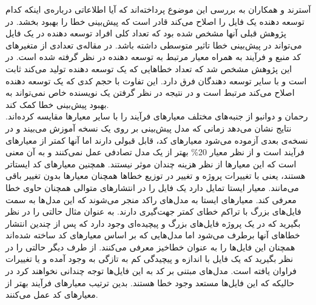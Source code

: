 آسترند و همکاران به بررسی این موضوع پرداخته‌اند که آیا اطلاعاتی درباره‌ی اینکه کدام توسعه دهنده یک فایل را اصلاح می‌کند قادر است که پیش‌بینی خطا را بهبود بخشد. در پژوهش قبلی آنها\cite{weyuker2008too} مشخص شده بود که تعداد کلی   افراد توسعه دهنده در یک فایل می‌تواند در پیش‌بینی خطا تاثیر متوسطی داشته باشد. در  مقاله‌ی \cite{ostrand2010programmer}  تعدادی از متغیرهای کد منبع و فرآیند به همراه معیار مرتبط به توسعه دهنده در نظر گرفته شده است.  در این پژوهش مشخص شد  که تعداد خطاهایی که یک توسعه دهنده تولید می‌کند ثابت است و با سایر توسعه دهندگان فرق دارد. این تفاوت با  حجم کدی که یک توسعه دهنده اصلاح می‌کند مرتبط است و در نتیجه در نظر گرفتن یک نویسنده خاص نمی‌تواند به بهبود پیش‌بینی خطا کمک کند\cite{ostrand2010programmer}. \\

رحمان و دوانبو از جنبه‌های مختلف معیارهای فرآیند  را با سایر معیارها مقایسه کرده‌اند\cite{rahman2013and}. نتایج نشان می‌دهد  زمانی که مدل پیش‌بینی بر روی یک نسخه آموزش می‌بیند و در نسخه‌ی بعدی آزموده می‌شود معیارهای کد،  قابل قبولی دارند اما    آنها کمتر از معیارهای فرآیند است  و از نظر معیار 20\% 
بهتر از یک مدل تصادفی عمل نمی‌کنند و  به آن معنی است که این معیارها از نظر هزینه چندان  موثر نیستند. همچنین معیارهای کد ایستاتر هستند، ‌یعنی با تغییرات پروژه و تغییر در توزیع خطاها همچنان معیارها بدون تغییر باقی می‌مانند. معیار ایستا تمایل دارد یک فایل را در انتشارهای متوالی همچنان حاوی خطا معرفی کند. معیارهای ایستا به مدل‌های راکد منجر می‌شوند که این مدل‌ها به سمت فایل‌های بزرگ با تراکم خطای کمتر جهت‌گیری دارند. به عنوان مثال حالتی را در نظر بگیرید که در یک پروژه فایل‌های بزرگ و پیچیده‌ای وجود دارد که پس از چندین انتشار خطاهای آنها برطرف می‌شود اما مدل‌هایی که بر اساس معیارهای کد ساخته شده‌اند همچنان این فایل‌ها را به عنوان خطا‌خیز معرفی می‌کنند. از طرف دیگر حالتی را در نظر بگیرید که یک فایل با اندازه و پیچیدگی کم به تازگی به وجود آمده و یا تغییرات فراوان یافته است. مدل‌های مبتنی بر کد به این فایل‌ها توجه چندانی نخواهند کرد در حالیکه که این فایل‌ها مستعد وجود خطا هستند. بدین ترتیب معیارهای فرآیند بهتر از معیارهای کد عمل می‌کنند. 
 
 
